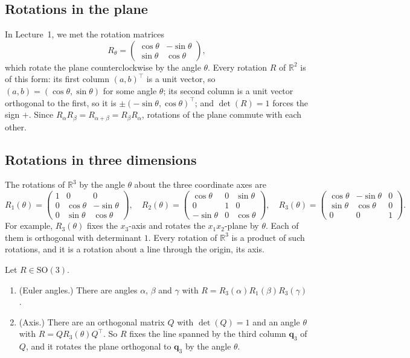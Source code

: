 \subsection{Rotations in the plane}

In Lecture~1, we met the rotation matrices
\[R_\theta = \begin{pmatrix} \cos\theta & -\sin\theta \\ \sin\theta & \cos\theta \end{pmatrix},\]
which rotate the plane counterclockwise by the angle $\theta$. Every rotation $R$ of $\mathbb{R}^2$ is of this form: its first column $(a, b)^\top$ is a unit vector, so $(a, b) = (\cos\theta, \sin\theta)$ for some angle $\theta$; its second column is a unit vector orthogonal to the first, so it is $\pm(-\sin\theta, \cos\theta)^\top$; and $\det(R) = 1$ forces the sign $+$. Since $R_\alpha R_\beta = R_{\alpha + \beta} = R_\beta R_\alpha$, rotations of the plane commute with each other.

\subsection{Rotations in three dimensions}

The rotations of $\mathbb{R}^3$ by the angle $\theta$ about the three coordinate axes are
\[R_1(\theta) = \begin{pmatrix} 1 & 0 & 0 \\ 0 & \cos\theta & -\sin\theta \\ 0 & \sin\theta & \cos\theta \end{pmatrix}, \quad R_2(\theta) = \begin{pmatrix} \cos\theta & 0 & \sin\theta \\ 0 & 1 & 0 \\ -\sin\theta & 0 & \cos\theta \end{pmatrix}, \quad R_3(\theta) = \begin{pmatrix} \cos\theta & -\sin\theta & 0 \\ \sin\theta & \cos\theta & 0 \\ 0 & 0 & 1 \end{pmatrix}.\]
For example, $R_3(\theta)$ fixes the $x_3$-axis and rotates the $x_1 x_2$-plane by $\theta$. Each of them is orthogonal with determinant $1$. Every rotation of $\mathbb{R}^3$ is a product of such rotations, and it is a rotation about a line through the origin, its axis.

\begin{proposition}\label{L2-prop:rotations-3d}
    Let $R \in \mathrm{SO}(3)$.
    \begin{enumerate}
        \item (Euler angles.) There are angles $\alpha$, $\beta$ and $\gamma$ with $R = R_3(\alpha)R_1(\beta)R_3(\gamma)$.
        \item (Axis.) There are an orthogonal matrix $Q$ with $\det(Q) = 1$ and an angle $\theta$ with $R = QR_3(\theta)Q^\top$. So $R$ fixes the line spanned by the third column $\mathbf{q}_3$ of $Q$, and it rotates the plane orthogonal to $\mathbf{q}_3$ by the angle $\theta$.
    \end{enumerate}
\end{proposition}

